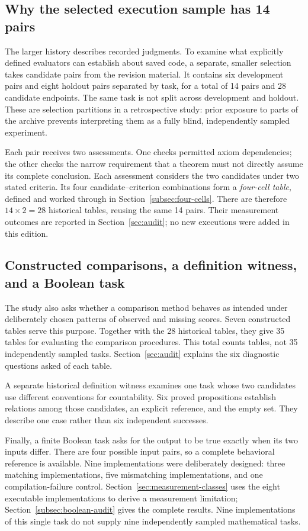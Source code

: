 \subsection{Why the selected execution sample has 14 pairs}
\label{subsec:execution-sample}
The larger history describes recorded judgments. To examine what explicitly defined evaluators can establish about saved code, a separate, smaller selection takes candidate pairs from the revision material. It contains six development pairs and eight holdout pairs separated by task, for a total of 14 pairs and 28 candidate endpoints. The same task is not split across development and holdout. These are selection partitions in a retrospective study: prior exposure to parts of the archive prevents interpreting them as a fully blind, independently sampled experiment.

Each pair receives two assessments. One checks permitted axiom dependencies; the other checks the narrow requirement that a theorem must not directly assume its complete conclusion. Each assessment considers the two candidates under two stated criteria. Its four candidate--criterion combinations form a \emph{four-cell table}, defined and worked through in Section~\ref{subsec:four-cells}. There are therefore $14\times2=28$ historical tables, reusing the same 14 pairs. Their measurement outcomes are reported in Section~\ref{sec:audit}; no new executions were added in this edition.

\subsection{Constructed comparisons, a definition witness, and a Boolean task}
\label{subsec:constructed-materials}
The study also asks whether a comparison method behaves as intended under deliberately chosen patterns of observed and missing scores. Seven constructed tables serve this purpose. Together with the 28 historical tables, they give 35 tables for evaluating the comparison procedures. This total counts tables, not 35 independently sampled tasks. Section~\ref{sec:audit} explains the six diagnostic questions asked of each table.

A separate historical definition witness examines one task whose two candidates use different conventions for countability. Six proved propositions establish relations among those candidates, an explicit reference, and the empty set. They describe one case rather than six independent successes.

Finally, a finite Boolean task asks for the output to be true exactly when its two inputs differ. There are four possible input pairs, so a complete behavioral reference is available. Nine implementations were deliberately designed: three matching implementations, five mismatching implementations, and one compilation-failure control. Section~\ref{sec:measurement-classes} uses the eight executable implementations to derive a measurement limitation; Section~\ref{subsec:boolean-audit} gives the complete results. Nine implementations of this single task do not supply nine independently sampled mathematical tasks.

